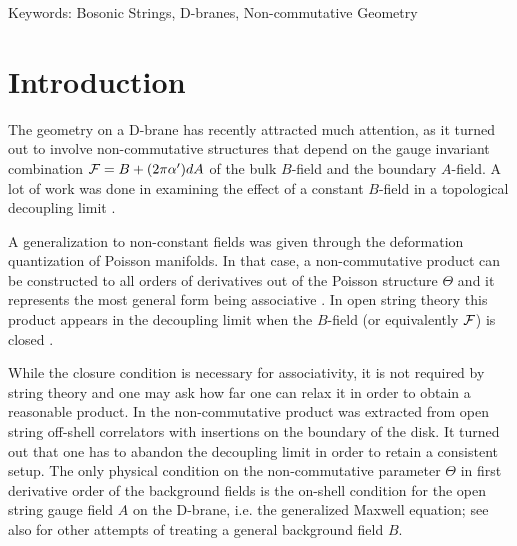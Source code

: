 \documentclass[a4paper,11pt]{article}               \def\new#1\endnew{{\bf #1}}
\newcommand {\cF} {{\cal F}}
\begin{document}
Keywords: Bosonic Strings, D-branes, Non-commutative Geometry \\[7pt]

\clearpage
\setcounter{page}{1}


\section{Introduction}
\label{sec:intro}

The geometry on a D-brane has recently attracted much attention, as it 
turned out to involve non-commutative structures that depend on 
the gauge invariant combination $\cF = B + (2\pi\alpha')dA$ of the bulk 
$B$-field and the boundary $A$-field.
A lot of work was done in examining the effect of a constant
$B$-field in a topological decoupling limit
\cite{Schomerus:1999ug,Seiberg:1999vs,Ardalan:1999ce,Ardalan:2000av,Chu:1999qz}.

A generalization to non-constant fields was given through the 
deformation quantization of Poisson manifolds. In that
case, a non-commutative product can be constructed to all orders
of derivatives out of the Poisson structure $\Theta$ and it 
represents the most general form being associative
\cite{Kontsevich:1997vb}. In open string 
theory this product appears in the decoupling limit when the $B$-field
(or equivalently $\cF$) is closed \cite{Cattaneo:2000fm}.

While the closure condition is necessary for associativity, it is
not required by
string theory and one may ask how far one can relax it in order to 
obtain a reasonable product. In \cite{Herbst:2001ai}
the non-commutative product was extracted from open string off-shell
correlators with insertions on the boundary of the disk.
It turned out that one has to abandon the decoupling limit in order to
retain a consistent setup. The only physical 
condition on the non-commutative parameter $\Theta$
in first derivative order of the background fields is the on-shell 
condition for the open
string gauge field $A$ on the D-brane, i.e. the generalized Maxwell
equation; see also \cite{Cornalba:2002sm,Ho:2000fv,Chu:2000gi,Ho:2001qk} 
for other attempts of treating a general background field $B$.
\end{document}
